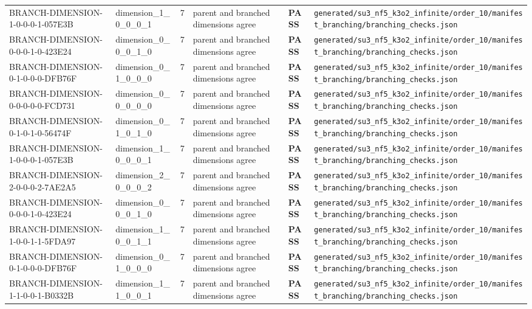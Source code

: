 \documentclass[11pt]{article}
\newcommand{\Pass}{\textcolor{green!50!black}{\textbf{PASS}}}
\newcommand{\RawPath}[1]{\texttt{#1}}
\begin{document}
\begin{longtable}{p{3cm}p{2.5cm}r p{3cm}l p{2cm}}
BRANCH-DIMENSION-1-0-0-0-1-057E3B & dimension\_1\_0\_0\_0\_1 & 7 & parent and branched dimensions agree & \Pass & \RawPath{generated/su3\_nf5\_k3o2\_infinite/order\_10/manifest\_branching/branching\_checks.json}\\
BRANCH-DIMENSION-0-0-0-1-0-423E24 & dimension\_0\_0\_0\_1\_0 & 7 & parent and branched dimensions agree & \Pass & \RawPath{generated/su3\_nf5\_k3o2\_infinite/order\_10/manifest\_branching/branching\_checks.json}\\
BRANCH-DIMENSION-0-1-0-0-0-DFB76F & dimension\_0\_1\_0\_0\_0 & 7 & parent and branched dimensions agree & \Pass & \RawPath{generated/su3\_nf5\_k3o2\_infinite/order\_10/manifest\_branching/branching\_checks.json}\\
BRANCH-DIMENSION-0-0-0-0-0-FCD731 & dimension\_0\_0\_0\_0\_0 & 7 & parent and branched dimensions agree & \Pass & \RawPath{generated/su3\_nf5\_k3o2\_infinite/order\_10/manifest\_branching/branching\_checks.json}\\
BRANCH-DIMENSION-0-1-0-1-0-56474F & dimension\_0\_1\_0\_1\_0 & 7 & parent and branched dimensions agree & \Pass & \RawPath{generated/su3\_nf5\_k3o2\_infinite/order\_10/manifest\_branching/branching\_checks.json}\\
BRANCH-DIMENSION-1-0-0-0-1-057E3B & dimension\_1\_0\_0\_0\_1 & 7 & parent and branched dimensions agree & \Pass & \RawPath{generated/su3\_nf5\_k3o2\_infinite/order\_10/manifest\_branching/branching\_checks.json}\\
BRANCH-DIMENSION-2-0-0-0-2-7AE2A5 & dimension\_2\_0\_0\_0\_2 & 7 & parent and branched dimensions agree & \Pass & \RawPath{generated/su3\_nf5\_k3o2\_infinite/order\_10/manifest\_branching/branching\_checks.json}\\
BRANCH-DIMENSION-0-0-0-1-0-423E24 & dimension\_0\_0\_0\_1\_0 & 7 & parent and branched dimensions agree & \Pass & \RawPath{generated/su3\_nf5\_k3o2\_infinite/order\_10/manifest\_branching/branching\_checks.json}\\
BRANCH-DIMENSION-1-0-0-1-1-5FDA97 & dimension\_1\_0\_0\_1\_1 & 7 & parent and branched dimensions agree & \Pass & \RawPath{generated/su3\_nf5\_k3o2\_infinite/order\_10/manifest\_branching/branching\_checks.json}\\
BRANCH-DIMENSION-0-1-0-0-0-DFB76F & dimension\_0\_1\_0\_0\_0 & 7 & parent and branched dimensions agree & \Pass & \RawPath{generated/su3\_nf5\_k3o2\_infinite/order\_10/manifest\_branching/branching\_checks.json}\\
BRANCH-DIMENSION-1-1-0-0-1-B0332B & dimension\_1\_1\_0\_0\_1 & 7 & parent and branched dimensions agree & \Pass & \RawPath{generated/su3\_nf5\_k3o2\_infinite/order\_10/manifest\_branching/branching\_checks.json}\\

\end{longtable}
\end{document}
